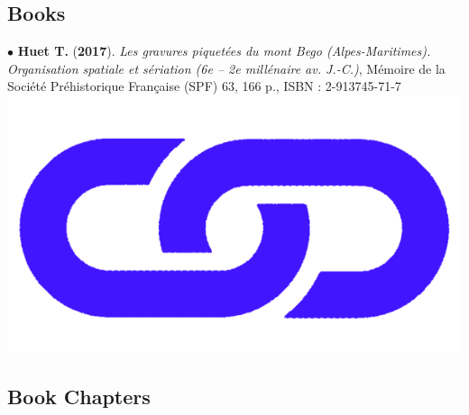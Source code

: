 \documentclass{article}
\newcommand{\fr}[1]{}       %
\newcommand{\en}[1]{#1}     %
\begin{document}
\subsection*{\fr{Ouvrages}\en{Books}}

\smallbreak
$\bullet$ \textbf{Huet T.} (\textbf{2017}). \textit{Les gravures piquet\'{e}es du mont Bego (Alpes-Maritimes). Organisation spatiale et s\'{e}riation (6e -- 2e mill\'{e}naire av. J.-C.)}, M\'{e}moire de la Soci\'{e}t\'{e} Pr\'{e}historique Fran\c{c}aise (SPF) 63, 166 p., ISBN : 2-913745-71-7 \href{http://www.prehistoire.org/shop_515-40342-0-0/m63-2017-les-gravures-piquetees-du-mont-bego-alpes-maritimes-organisation-spatiale-et-seriation-vie-iie-millenaire-av.-j.-c.-t.-huet.html}{\includegraphics[scale=0.015]{link_darkblue.png}}

\bigbreak

\subsection*{\fr{Ouvrages (chapitres d')}\en{Book Chapters}}
\end{document}
